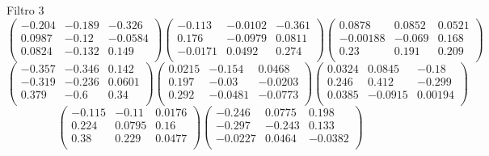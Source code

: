 Filtro 3
{ \small
\[
\begin{pmatrix}
  -0.204 & -0.189 & -0.326 \\
  0.0987 & -0.12 & -0.0584 \\
  0.0824 & -0.132 & 0.149 \\
\end{pmatrix}
\begin{pmatrix}
  -0.113 & -0.0102 & -0.361 \\
  0.176 & -0.0979 & 0.0811 \\
  -0.0171 & 0.0492 & 0.274 \\
\end{pmatrix}
\begin{pmatrix}
  0.0878 & 0.0852 & 0.0521 \\
  -0.00188 & -0.069 & 0.168 \\
  0.23 & 0.191 & 0.209 \\
\end{pmatrix}
\]
\[
\begin{pmatrix}
  -0.357 & -0.346 & 0.142 \\
  -0.319 & -0.236 & 0.0601 \\
  0.379 & -0.6 & 0.34 \\
\end{pmatrix}
\begin{pmatrix}
  0.0215 & -0.154 & 0.0468 \\
  0.197 & -0.03 & -0.0203 \\
  0.292 & -0.0481 & -0.0773 \\
\end{pmatrix}
\begin{pmatrix}
  0.0324 & 0.0845 & -0.18 \\
  0.246 & 0.412 & -0.299 \\
  0.0385 & -0.0915 & 0.00194 \\
\end{pmatrix}
\]
\[
\begin{pmatrix}
  -0.115 & -0.11 & 0.0176 \\
  0.224 & 0.0795 & 0.16 \\
  0.38 & 0.229 & 0.0477 \\
\end{pmatrix}
\begin{pmatrix}
  -0.246 & 0.0775 & 0.198 \\
  -0.297 & -0.243 & 0.133 \\
  -0.0227 & 0.0464 & -0.0382 \\
\end{pmatrix}
\]
}

